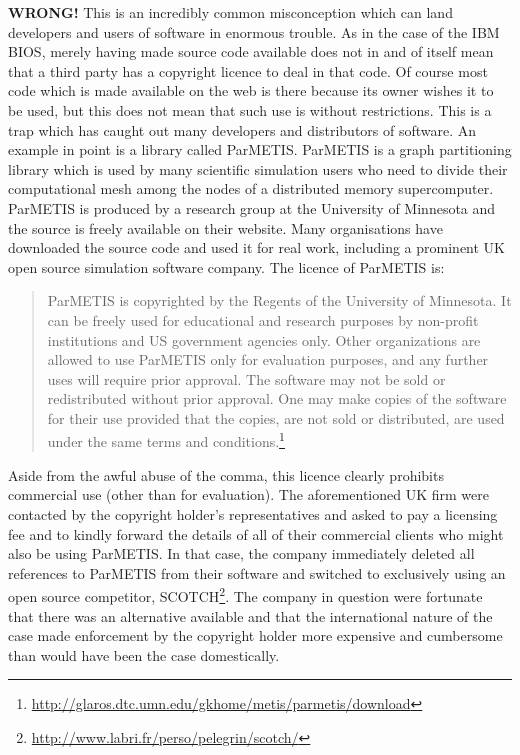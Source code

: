 \documentclass[a4paper,12pt]{article}
\begin{document}
\textbf{WRONG!} This is an incredibly common misconception which can land
developers and users of software in enormous trouble. As in the case of
the IBM BIOS, merely having made source code available does not in and of
itself mean that a third party has a copyright licence to deal in that
code. Of course most code which is made available on the web is there
because its owner wishes it to be used, but this does not mean that such use
is without restrictions. This is a trap which has caught out many developers
and distributors of software. An example in point is a library called
ParMETIS. ParMETIS is a graph partitioning library which is used by many scientific simulation users who need to divide their
computational mesh among the nodes of a distributed memory
supercomputer. ParMETIS is produced by a research group at the University of
Minnesota and the source is freely available on their website. Many
organisations have downloaded the source code and used it for real work,
including a prominent UK open source simulation software company. The
licence of ParMETIS is:
\begin{quotation}
  ParMETIS is copyrighted by the Regents of the University of Minnesota. It
  can be freely used for educational and research purposes by non-profit
  institutions and US government agencies only. Other organizations are
  allowed to use ParMETIS only for evaluation purposes, and any further uses
  will require prior approval. The software may not be sold or redistributed
  without prior approval. One may make copies of the software for their use
  provided that the copies, are not sold or distributed, are used under the
  same terms and conditions.\footnote{\url{http://glaros.dtc.umn.edu/gkhome/metis/parmetis/download}}
\end{quotation}
Aside from the awful abuse of the comma, this licence clearly prohibits
commercial use (other than for evaluation). The aforementioned UK firm were
contacted by the copyright holder's representatives and asked to pay a
licensing fee and to kindly forward the details of all of their commercial
clients who might also be using ParMETIS. In that case, the company
immediately deleted all references to ParMETIS from their software and
switched to exclusively using an open source competitor,
SCOTCH\footnote{\url{http://www.labri.fr/perso/pelegrin/scotch/}}. The
company in question were fortunate that there was an alternative available
and that the international nature of the case made enforcement by the
copyright holder more expensive and cumbersome than would have been the case
domestically. 
\end{document}
